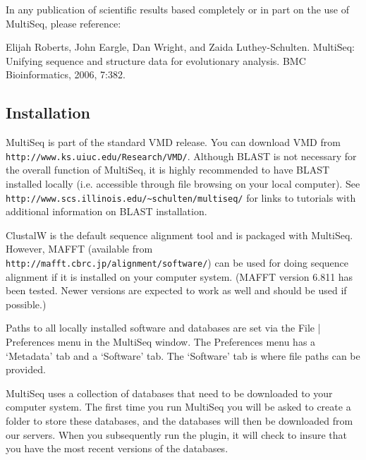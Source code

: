 In any publication of scientific results based completely or in part on
the use of MultiSeq, please reference:

Elijah Roberts, John Eargle, Dan Wright, and Zaida Luthey-Schulten.
MultiSeq: Unifying sequence and structure data for evolutionary
analysis.  BMC Bioinformatics, 2006, 7:382.


\subsection{Installation}
MultiSeq is part of the standard VMD release.  You can download VMD
from \texttt{http://www.ks.uiuc.edu/Research/VMD/}.  Although BLAST is
not necessary for the overall function of MultiSeq, it is highly
recommended to have BLAST installed locally (i.e. accessible through
file browsing on your local computer).  See
\texttt{http://www.scs.illinois.edu/\~{}schulten/multiseq/} for links to
tutorials with additional information on BLAST installation.

ClustalW is the default sequence alignment tool and is packaged with
MultiSeq.  However, MAFFT (available from
\texttt{http://mafft.cbrc.jp/alignment/software/}) can be used for doing
sequence alignment if it is installed on your computer system.  (MAFFT
version 6.811 has been tested.  Newer versions are expected to work as
well and should be used if possible.)

Paths to all locally installed software and databases are set via the
\textsf{File} | \textsf{Preferences} menu in the MultiSeq window.  The
\textsf{Preferences} menu has a `Metadata' tab and a `Software' tab.
The `Software' tab is where file paths can be provided.

MultiSeq uses a collection of databases that need to be downloaded to
your computer system.  The first time you run MultiSeq you
will be asked to create a folder to store these databases, and the
databases will then be downloaded from our servers.  When you
subsequently run the plugin, it will check to insure that you have the
most recent versions of the databases.



